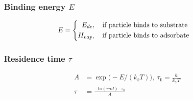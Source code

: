 \subsubsection*{Binding energy $E$}
\begin{equation}
	\label{eq:energy}
	E=
	\begin{cases}
		\begin{split}
		E_{de}&, \text{\quad if particle binds to substrate}\\
		H_{vap}&,  \text{\quad if particle binds to adsorbate}
		\end{split}
	\end{cases}
\end{equation}


\subsubsection*{Residence time $\tau$}
\begin{equation}
	\label{eq:sojourntime}
	\begin{split}
		A&=\exp\big( - E/(k_b T)\big),\ \tau_0 = \frac{h}{k_b \, T}\\
		\tau &= \frac{-\text{ln}(rnd) \cdot \tau_0}{A}
	\end{split}
\end{equation}
\begin{comment}
\subsubsection*{Step size $t_{step}$}
\begin{equation}
	\label{eq:tstep}
	\begin{split}
	t_{min}&=\text{ProblemDef::t\_min}\\
	t_{i}&=t_{min} \cdot \exp\big(\text{i}\cdot \ln(\text{ProblemDef::maxTimeS}/T_{min})/\text{ProblemDef::iterationNumber})\big)\\
	t_{step}&=\text{min}\big(t_{currentStep+1}-t_{currentStep}, \text{ProblemDef::t\_max}\big)\\
	\end{split}
\end{equation}
\end{comment}
